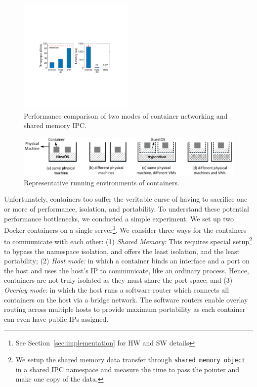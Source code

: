 \begin{figure}[th]
     \centering 
     \includegraphics[width=0.5\textwidth]{figures/intro/intro_exist2.pdf} 
     \caption{Performance comparison of two modes of container networking and shared memory IPC.} 
     \label{fig:three_modes} 
\end{figure} 
\begin{figure} [t]
	\centering
	\includegraphics[width=6.7in]{figures/deployment-cases.pdf} 
	\caption{\label{fig:deploy-cases} Representative running environments of containers.}
\end{figure}

Unfortunately, containers too suffer the veritable curse of having to sacrifice
one or more of performance, isolation, and portability. To understand these
potential performance bottlenecks, we conducted a simple experiment. We set up
two Docker containers on a single server\footnote{See Section~\ref{sec:implementation} for HW and SW details}. We consider three
ways for the containers to communicate with each other: (1) {\em Shared Memory:}
This requires special setup\footnote{We setup the shared memory data transfer
through \texttt{shared memory object} in a shared IPC namespace and measure the
time to pass the pointer and make one copy of the data.} to bypass the
namespace isolation, and offers the least isolation, and the least portability;
(2) {\em Host mode:} in which a container binds an interface and a port on the
host and uses the host's IP to communicate, like an ordinary process. Hence,
containers are not truly isolated as they must share the port space; and (3)
{\em Overlay mode:} in which the host runs a software router which connects all
containers on the host via a bridge network. The software routers enable
overlay routing across multiple hosts to provide maximum portability as each
container can even have public IPs assigned.

